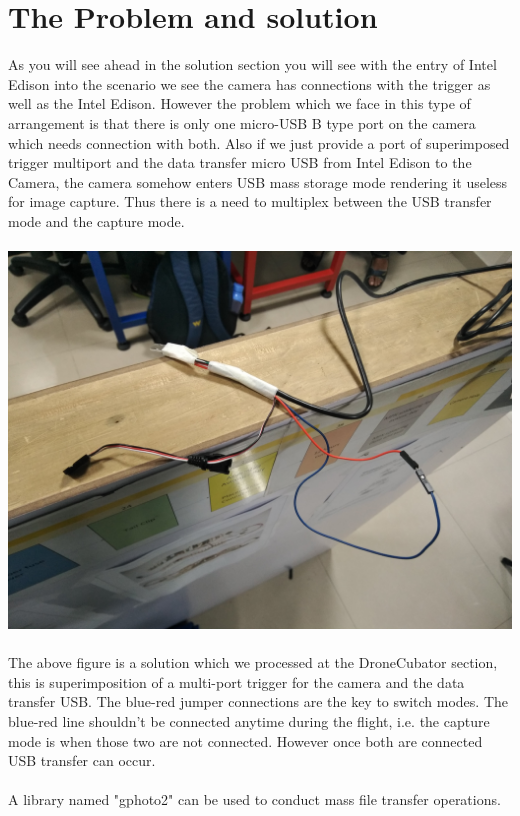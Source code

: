 \documentclass[12pt]{report}
\begin{document}
\section{The Problem and solution}
As you will see ahead in the solution section  you will see with the entry of Intel Edison into the scenario we see the camera has connections with the trigger as well as the Intel Edison. However the problem which we face in this type of arrangement is that there is only one micro-USB B type port on the camera which needs connection with both. Also if we just provide a port of superimposed trigger multiport and the data transfer micro USB from Intel Edison to the Camera, the camera somehow enters USB mass storage mode rendering it useless for image capture. Thus there is a need to multiplex between the USB transfer mode and the capture mode.
\\
\\
\includegraphics[width=\linewidth]{Camera_USB.jpg}
\\ \\
The above figure is a solution which we processed at the DroneCubator section, this is superimposition of a multi-port trigger for the camera and the data transfer USB. The blue-red jumper connections are the key to switch modes. The blue-red line shouldn't be connected anytime during the flight, i.e. the capture mode is when those two are not connected. However once both are connected USB transfer can occur.
\\
\\
A library named "gphoto2" can be used to conduct mass file transfer operations.
\end{document}
